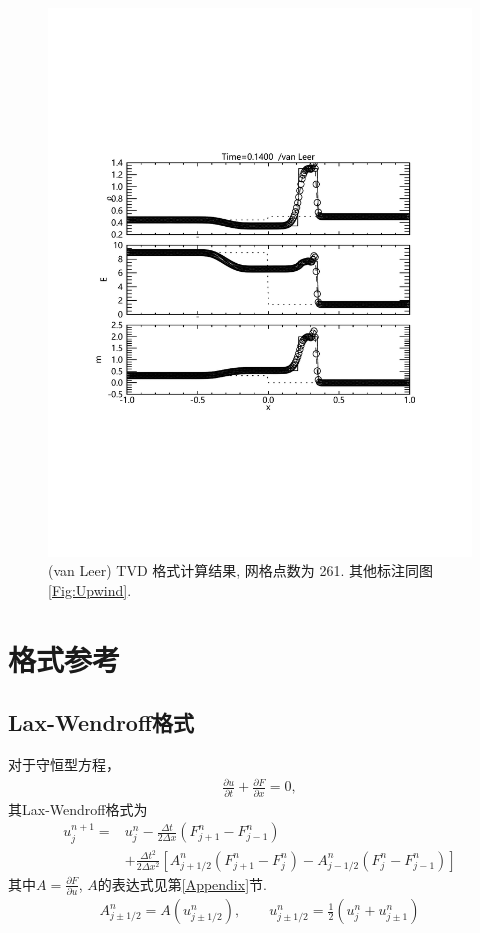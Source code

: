 \documentclass[10.5pt
]{article}
\begin{document}
\begin{figure}
\begin{center}
\includegraphics[width=.85\textwidth]{fig_tvd.pdf}
\caption{(van Leer) TVD 格式计算结果, 网格点数为 261. 其他标注同图\ref{Fig:Upwind}.}\label{Fig:vanLeerB}
\end{center}
\end{figure}

\section{格式参考}
\subsection{Lax-Wendroff格式}
对于守恒型方程，
\begin{align}
\frac{\partial u}{\partial t} + \frac{\partial F}{\partial x} = 0,
\end{align}
其Lax-Wendroff格式为
\begin{align}
u_j^{n+1} =& u_j^n - \frac{\Delta t}{2\Delta x} (F_{j+1}^n - F_{j-1}^n) \nonumber\\
& + \frac{\Delta t^2}{2\Delta x^2} \left[A_{j+1/2}^n (F_{j+1}^n-F_j^n) - A_{j-1/2}^n (F_j^n -
F_{j-1}^n)\right]
\end{align}
其中$A = \frac{\partial F}{\partial u}$, $A$的表达式见第\ref{Appendix}节.
\begin{align}
A_{j \pm 1/2}^n = A(u_{j \pm 1/2}^n), \qquad u_{j \pm 1/2}^n = \frac{1}{2} (u_j^n + u_{j \pm 1}^n)
\end{align}
\end{document}
